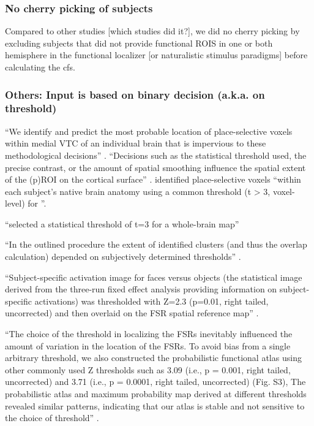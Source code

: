 \subsubsection{No cherry picking of subjects}

%
Compared to other studies [which studies did it?], we did no cherry picking by
excluding subjects that did not provide functional ROIS in one or both
hemisphere in the functional localizer [or naturalistic stimulus paradigms]
before calculating the \ac{cfs}.



\subsubsection{Others: Input is based on binary decision (a.k.a. on threshold)}

%
``We identify and predict the most probable location of place-selective voxels
within medial VTC of an individual brain that is impervious to these
methodological decisions'' \citep{weiner2018defining}.
%
``Decisions such as the statistical threshold used, the precise contrast, or the
amount of spatial smoothing influence the spatial extent of the (p)ROI on the
cortical surface'' \citep{weiner2018defining}.
%
\citet{weiner2018defining} identified place-selective voxels ``within each
subject's native brain anatomy using a common threshold (t > 3, voxel-level) for
''.

%
\citet{rosenke2021probabilistic} ``selected a statistical threshold of t=3 for a
whole-brain map''


%
``In the outlined procedure the extent of identified clusters (and thus the
overlap calculation) depended on subjectively determined thresholds''
\citep{frost2012measuring}.


%
``Subject-specific activation image for faces versus objects (the statistical
image derived from the three-run fixed effect analysis providing information on
subject-specific activations) was thresholded with Z=2.3 (p=0.01, right tailed,
uncorrected) and then overlaid on the FSR spatial reference map''
\citep{zhen2015quantifying}.


%
``The choice of the threshold in localizing the FSRs inevitably influenced the
amount of variation in the location of the FSRs.
%
To avoid bias from a single arbitrary threshold, we also constructed the
probabilistic functional atlas using other commonly used Z thresholds such as
3.09 (i.e., p = 0.001, right tailed, uncorrected) and 3.71 (i.e., p = 0.0001,
right tailed, uncorrected) (Fig. S3),
%
The probabilistic atlas and maximum probability map derived at different
thresholds revealed similar patterns, indicating that our atlas is stable and
not sensitive to the choice of threshold'' \citep{zhen2015quantifying}.



